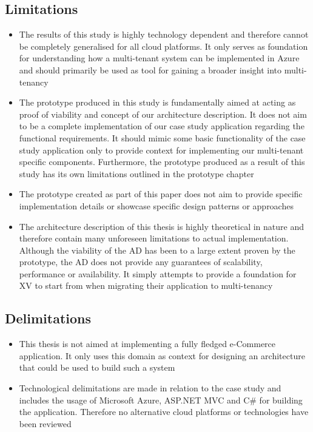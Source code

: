 \subsection{Limitations}
\begin{itemize}
\item The results of this study is highly technology dependent and therefore cannot be completely generalised for all cloud platforms. It only serves as foundation for understanding how a multi-tenant system can be implemented in Azure and should primarily be used as tool for gaining a broader insight into multi-tenancy
\item The prototype produced in this study is fundamentally aimed at acting as proof of viability and concept of our architecture description. It does not aim to be a complete implementation of our case study application regarding the functional requirements. It should mimic some basic functionality of the case study application only to provide context for implementing our multi-tenant specific components. Furthermore, the prototype produced as a result of this study has its own limitations outlined in the prototype chapter
\item The prototype created as part of this paper does not aim to provide specific implementation details or showcase specific design patterns or approaches
\item The architecture description of this thesis is highly theoretical in nature and therefore contain many unforeseen limitations to actual implementation. Although the viability of the AD has been to a large extent proven by the prototype, the AD does not provide any guarantees of scalability, performance or availability. It simply attempts to provide a foundation for XV to start from when migrating their application to multi-tenancy
\end{itemize}

\subsection{Delimitations}
\begin{itemize}
\item This thesis is not aimed at implementing a fully fledged e-Commerce application. It only uses this domain as context for designing an architecture that could be used to build such a system
\item Technological delimitations are made in relation to the case study and includes the usage of Microsoft Azure, ASP.NET  MVC and C\# for building the application. Therefore no alternative cloud platforms or technologies have been reviewed 
\end{itemize}


